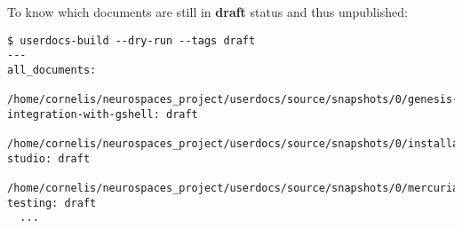 \documentclass[12pt]{article}
\begin{document}
To know which documents are still in {\bf draft} status and thus
unpublished:

\begin{verbatim}
$ userdocs-build --dry-run --tags draft
---
all_documents:
  /home/cornelis/neurospaces_project/userdocs/source/snapshots/0/genesis-integration-with-gshell: draft
  /home/cornelis/neurospaces_project/userdocs/source/snapshots/0/installation-studio: draft
  /home/cornelis/neurospaces_project/userdocs/source/snapshots/0/mercurial-testing: draft
  ...
\end{verbatim}
\end{document}
